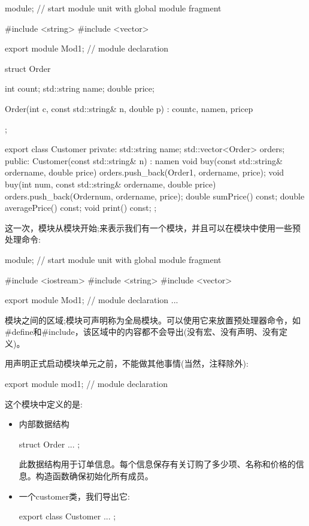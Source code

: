 \begin{cpp}
module; // start module unit with global module fragment

#include <string>
#include <vector>

export module Mod1; // module declaration

struct Order {
	int count;
	std::string name;
	double price;

	Order(int c, const std::string& n, double p)
	: count{c}, name{n}, price{p} {
	}
};

export class Customer {
private:
	std::string name;
	std::vector<Order> orders;
public:
	Customer(const std::string& n)
	: name{n} {
	}
	void buy(const std::string& ordername, double price) {
		orders.push_back(Order{1, ordername, price});
	}
	void buy(int num, const std::string& ordername, double price) {
		orders.push_back(Order{num, ordername, price});
	}
	double sumPrice() const;
	double averagePrice() const;
	void print() const;
};
\end{cpp}

这一次，模块从模块开始;来表示我们有一个模块，并且可以在模块中使用一些预处理命令:

\begin{cpp}
module; // start module unit with global module fragment

#include <iostream>
#include <string>
#include <vector>

export module Mod1; // module declaration
...
\end{cpp}

模块之间的区域;模块可声明称为全局模块。可以使用它来放置预处理器命令，如\#define和\#include，该区域中的内容都不会导出(没有宏、没有声明、没有定义)。

用声明正式启动模块单元之前，不能做其他事情(当然，注释除外):

\begin{cpp}
export module mod1; // module declaration
\end{cpp}

这个模块中定义的是:

\begin{itemize}
\item
内部数据结构

\begin{cpp}
struct Order {
	...
};
\end{cpp}

此数据结构用于订单信息。每个信息保存有关订购了多少项、名称和价格的信息。构造函数确保初始化所有成员。

\item
一个customer类，我们导出它:

\begin{cpp}
export class Customer {
	...
};
\end{cpp}
\end{itemize}

